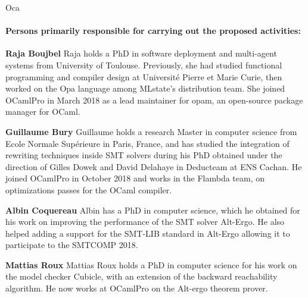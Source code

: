 \begin{sitedescription}{Oca}
\paragraph*{Persons primarily responsible for carrying out the proposed activities:}

\begin{compactitem} %
  \item{\bf Raja Boujbel} Raja holds a PhD in software deployment and
    multi-agent systems from University of Toulouse. Previously, she had studied
    functional programming and compiler design at Université Pierre et Marie
    Curie, then worked on the Opa language among MLstate’s distribution team.
    She joined OCamlPro in March 2018 as a lead maintainer for opam, an
    open-source package manager for OCaml.
\item{\bf Guillaume Bury} Guillaume holds a research Master in computer
    science from Ecole Normale Supérieure in Paris, France, and has studied the
    integration of rewriting techniques inside SMT solvers during his PhD
    obtained under the direction of Gilles Dowek and David Delahaye in
    Deducteam at ENS Cachan. He joined OCamlPro in October 2018 and works in
    the Flambda team, on optimizations passes for the OCaml compiler.
\item{\bf Albin Coquereau} Albin has a PhD in computer science,
    which he obtained for his work on improving the performance of the SMT
    solver Alt-Ergo. He also helped adding a support for the SMT-LIB standard
    in Alt-Ergo allowing it to participate to the SMTCOMP 2018.
\item{\bf Mattias Roux} Mattias Roux holds a PhD in computer science
    for his work on the model checker Cubicle, with an extension of the backward
    reachability algorithm. He now works at OCamlPro on the Alt-ergo theorem
    prover.
\end{compactitem}

\end{sitedescription}

